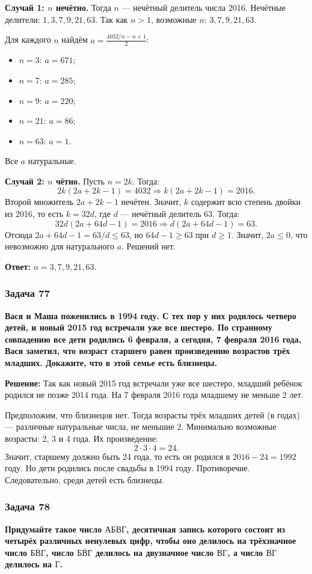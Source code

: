 \documentclass[12pt, a4paper]{article}
\begin{document}
\textbf{Случай 1: $n$ нечётно.} Тогда $n$ — нечётный делитель числа 2016. Нечётные делители: $1, 3, 7, 9, 21, 63$. Так как $n > 1$, возможные $n$: $3, 7, 9, 21, 63$.

Для каждого $n$ найдём $a = \frac{4032/n - n + 1}{2}$:
\begin{itemize}
    \item $n=3$: $a = 671$;
    \item $n=7$: $a = 285$;
    \item $n=9$: $a = 220$;
    \item $n=21$: $a = 86$;
    \item $n=63$: $a = 1$.
\end{itemize}
Все $a$ натуральные.

\textbf{Случай 2: $n$ чётно.} Пусть $n = 2k$. Тогда:
\[
2k(2a + 2k - 1) = 4032 \Rightarrow k(2a + 2k - 1) = 2016.
\]
Второй множитель $2a + 2k - 1$ нечётен. Значит, $k$ содержит всю степень двойки из 2016, то есть $k = 32d$, где $d$ — нечётный делитель 63. Тогда:
\[
32d(2a + 64d - 1) = 2016 \Rightarrow d(2a + 64d - 1) = 63.
\]
Отсюда $2a + 64d - 1 = 63/d \le 63$, но $64d - 1 \ge 63$ при $d \ge 1$. Значит, $2a \le 0$, что невозможно для натурального $a$. Решений нет.

\textbf{Ответ:} $n = 3, 7, 9, 21, 63$.

\subsubsection*{Задача 77}
\textbf{Вася и Маша поженились в 1994 году. С тех пор у них родилось четверо детей, и новый 2015 год встречали уже все шестеро. По странному совпадению все дети родились 6 февраля, а сегодня, 7 февраля 2016 года, Вася заметил, что возраст старшего равен произведению возрастов трёх младших. Докажите, что в этой семье есть близнецы.}

\textbf{Решение:}
Так как новый 2015 год встречали уже все шестеро, младший ребёнок родился не позже 2014 года. На 7 февраля 2016 года младшему не меньше 2 лет.

Предположим, что близнецов нет. Тогда возрасты трёх младших детей (в годах) — различные натуральные числа, не меньшие 2. Минимально возможные возрасты: 2, 3 и 4 года. Их произведение:
\[
2 \cdot 3 \cdot 4 = 24.
\]
Значит, старшему должно быть 24 года, то есть он родился в \(2016 - 24 = 1992\) году. Но дети родились после свадьбы в 1994 году. Противоречие. Следовательно, среди детей есть близнецы.

\subsubsection*{Задача 78}
\textbf{Придумайте такое число $\overline{\text{АБВГ}}$, десятичная запись которого состоит из четырёх различных ненулевых цифр, чтобы оно делилось на трёхзначное число $\overline{\text{БВГ}}$, число $\overline{\text{БВГ}}$ делилось на двузначное число $\overline{\text{ВГ}}$, а число $\overline{\text{ВГ}}$ делилось на $\text{Г}$.}
\end{document}

